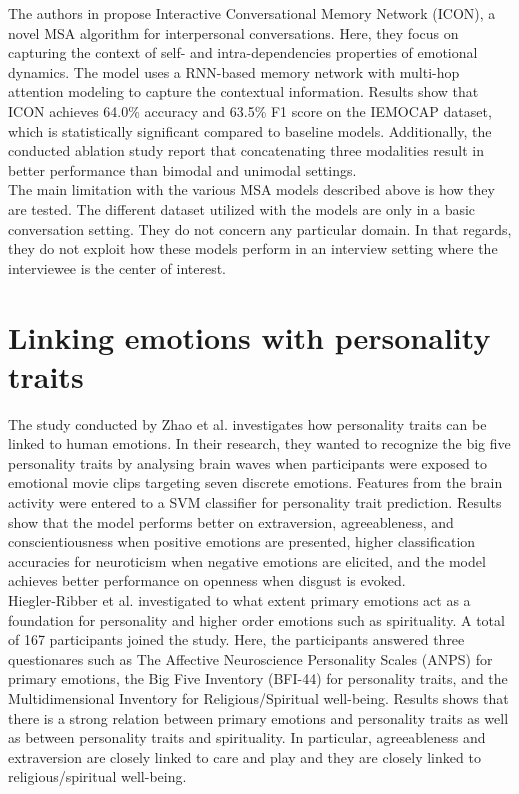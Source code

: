 %
\newline
\indent The authors in \cite{ICON_hazarika-etal-2018-icon} propose Interactive Conversational Memory Network (ICON), a novel MSA algorithm for interpersonal conversations. Here, they focus on capturing the context of self- and intra-dependencies properties of emotional dynamics. The model uses a RNN-based memory network with multi-hop attention modeling to capture the contextual information. Results show that ICON achieves 64.0\% accuracy and 63.5\% F1 score on the IEMOCAP dataset, which is statistically significant compared to baseline models. Additionally, the conducted ablation study report that concatenating three modalities result in better performance than bimodal and unimodal settings. \\

The main limitation with the various MSA models described above is how they are tested. The different dataset utilized with the models are only in a basic conversation setting. They do not concern any particular domain. In that regards, they do not exploit how these models perform in an interview setting where the interviewee is the center of interest.  

\section{Linking emotions with personality traits}
\label{sec:emotion-personality-link}
The study conducted by Zhao et al. \cite{Zhao2018} investigates how personality traits can be linked to human emotions. In their research, they wanted to recognize the big five personality traits by analysing brain waves when participants were exposed to emotional movie clips targeting seven discrete emotions. Features from the brain activity were entered to a SVM classifier for personality trait prediction. Results show that the model performs better on extraversion, agreeableness, and conscientiousness when positive emotions are presented, higher classification accuracies for neuroticism when negative emotions are elicited, and the model achieves better performance on openness when disgust is evoked. \\

Hiegler-Ribber et al. \cite{personality_emotions_link} investigated to what extent primary emotions act as a foundation for personality and higher order emotions such as spirituality. A total of 167 participants joined the study. Here, the participants answered three questionares such as The Affective Neuroscience Personality Scales (ANPS) for primary emotions, the Big Five Inventory (BFI-44) for personality traits, and the Multidimensional Inventory for Religious/Spiritual well-being. Results shows that there is a strong relation between primary emotions and personality traits as well as between personality traits and spirituality. In particular, agreeableness and extraversion are closely linked to care and play and they are closely linked to religious/spiritual well-being. \\ 

